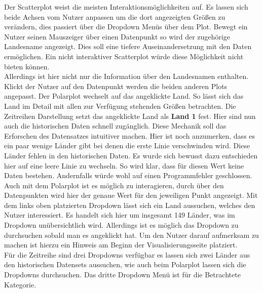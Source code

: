 Der Scatterplot weist die meisten Interaktionsmöglichkeiten auf. Es lassen sich beide Achsen vom Nutzer anpassen um die dort angezeigten Größen zu verändern, dies passiert über die Dropdown Menüs über dem Plot. Bewegt ein Nutzer seinen Mauszeiger über einen Datenpunkt so wird der zugehörige Landesname angezeigt. Dies soll eine tiefere Auseinandersetzung mit den Daten ermöglichen. Ein nicht interaktiver Scatterplot würde diese Möglichkeit nicht bieten können. \\

Allerdings ist hier nicht nur die Information über den Landesnamen enthalten. Klickt der Nutzer auf den Datenpunkt werden die beiden anderen Plots angepasst. Der Polarplot wechselt auf das angeklickte Land. So lässt sich das Land im Detail mit allen zur Verfügung stehenden Größen betrachten. Die Zeitreihen Darstellung setzt das angeklickte Land als \textbf{Land 1} fest. Hier sind nun auch die historischen Daten schnell zugänglich. Diese Mechanik soll das Erforschen des Datensatzes intuitiver machen. Hier ist noch anzumerken, dass es ein paar wenige Länder gibt bei denen die erste Linie verschwinden wird. Diese Länder fehlen in den historischen Daten. Es wurde sich bewusst dazu entschieden hier auf eine leere Linie zu wechseln. So wird klar, dass für diesen Wert keine Daten bestehen. Andernfalls würde wohl auf einen Programmfehler geschlossen.\\

Auch mit dem Polarplot ist es möglich zu interagieren, durch  über den Datenpunkten wird hier der genaue Wert für den jeweiligen Punkt angezeigt. 
Mit dem links oben platzierten Dropdown lässt sich ein Land aussuchen, welches den Nutzer interessiert. Es handelt sich hier um insgesamt 149 Länder, was im Dropdown unübersichtlich wird. Allerdings ist es möglich das Dropdown zu durchsuchen sobald man es angeklickt hat. Um den Nutzer darauf aufmerksam zu machen ist hierzu ein Hinweis  am Beginn der Visualisierungsseite platziert. \\

Für die Zeitreihe sind drei Dropdowns verfügbar es lassen sich zwei Länder aus den historischen Datensets aussuchen, wie auch beim Polarplot lassen sich die Dropdowns durchsuchen. Das dritte Dropdown Menü ist für die Betrachtete Kategorie.